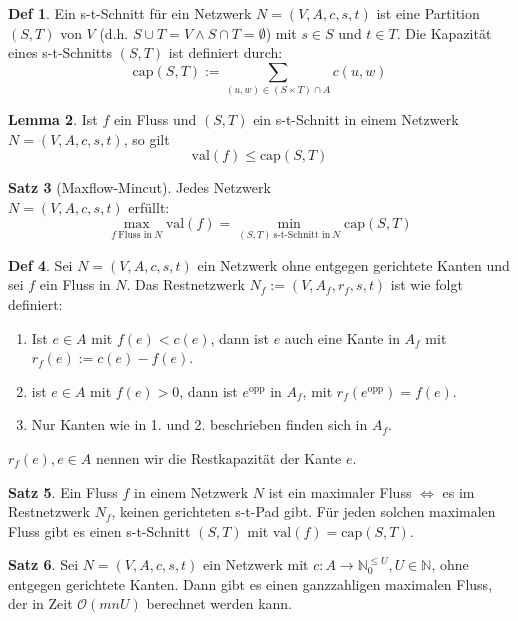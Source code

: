 \documentclass[a4paper, 10pt]{article}
\theoremstyle{definition}
\newtheorem{definition}{Def}[section]
\newtheorem{theorem}[definition]{Satz}
\newtheorem{nlemma}[definition]{Lemma}
\theoremstyle{named}
\newcommand{\N}{\mathbb{N}}
\newcommand{\BO}{\mathcal{O}}
\newcommand{\val}{\text{val}}
\newcommand{\net}{N = (V, A, c, s, t)}
\begin{document}
\begin{definition}
    Ein s-t-Schnitt für ein Netzwerk $\net$ ist eine Partition $(S, T)$ von $V$ (d.h. $S \cup T = V \land S \cap T = \emptyset$) mit $s \in S$ und $t \in T$. Die Kapazität eines s-t-Schnitts $(S, T)$ ist definiert durch:
    $$\text{cap}(S, T) := \sum_{(u, w) \in (S \times T) \cap A} c(u, w)$$
\end{definition}

\begin{nlemma}
    Ist $f$ ein Fluss und $(S, T)$ ein s-t-Schnitt in einem Netzwerk $\net$, so gilt
    $$\val(f) \leq \text{cap}(S, T)$$
\end{nlemma}

\begin{theorem}[Maxflow-Mincut]
    Jedes Netzwerk \\
    $\net$ erfüllt:
    $$\max_{f \ \text{Fluss in} \ N} \val(f) = \min_{(S, T) \ \text{s-t-Schnitt in} \ N} \text{cap}(S, T)$$
\end{theorem}

\begin{definition}
    Sei $\net$ ein Netzwerk ohne entgegen gerichtete Kanten und sei $f$ ein Fluss in $N$. Das Restnetzwerk $N_f := (V, A_f, r_f, s, t)$ ist wie folgt definiert:
    \begin{enumerate}
        \item Ist $e \in A$ mit $f(e) < c(e)$, dann ist $e$ auch eine Kante in $A_f$ mit $r_f(e) := c(e) - f(e)$.
        \item ist $e \in A$ mit $f(e) > 0$, dann ist $e^{\text{opp}}$ in $A_f$, mit $r_f(e^{\text{opp}}) = f(e)$.
        \item Nur Kanten wie in 1. und 2. beschrieben finden sich in $A_f$.
    \end{enumerate}
    $r_f(e), e \in A$ nennen wir die Restkapazität der Kante $e$.
\end{definition}

\begin{theorem}
    Ein Fluss $f$ in einem Netzwerk $N$ ist ein maximaler Fluss $\iff$ es im Restnetzwerk $N_f$, keinen gerichteten s-t-Pad gibt. Für jeden solchen maximalen Fluss gibt es einen s-t-Schnitt $(S, T)$ mit $\val(f) = \text{cap}(S, T)$.
\end{theorem}

\begin{theorem}
    Sei $\net$ ein Netzwerk mit $c: A \to \N_0^{\leq U}, U \in \N$, ohne entgegen gerichtete Kanten. Dann gibt es einen ganzzahligen maximalen Fluss, der in Zeit $\BO(mnU)$ berechnet werden kann.
\end{theorem}
\end{document}
